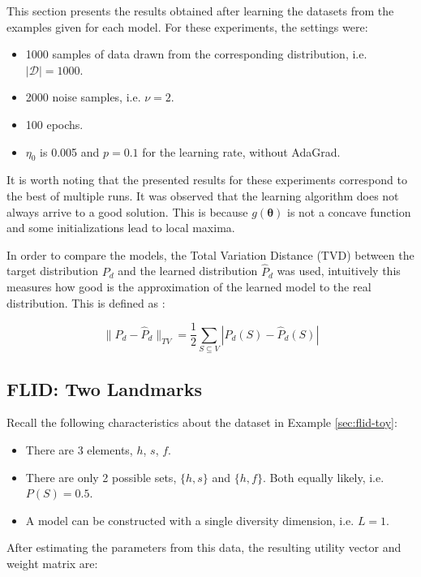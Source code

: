 This section presents the results obtained after learning the datasets from the examples given for each model. For these experiments, the settings were:

\begin{itemize}
  \item 1000 samples of data drawn from the corresponding distribution, i.e. $|\mathcal{D}| = 1000$.
  \item 2000 noise samples, i.e. $\nu = 2$.
  \item 100 epochs.
  \item $\eta_{0}$ is 0.005 and $p = 0.1$ for the learning rate, without AdaGrad.
\end{itemize}

It is worth noting that the presented results for these experiments correspond to the best of multiple runs. It was observed that the learning algorithm does not always arrive to a good solution. This is because $g(\boldsymbol{\theta})$ is not a concave function and some initializations lead to local maxima.

In order to compare the models, the Total Variation Distance (TVD) between the target distribution $P_{d}$ and the learned distribution $\hat{P}_{d}$ was used, intuitively this measures how good is the approximation of the learned model to the real distribution. This is defined as \citep[chap. 4]{levin2009markov}:

\begin{equation}
  \label{eq:total_var}
  \|P_{d} - \hat{P}_{d}\|_{TV}= \frac{1}{2}\sum_{S \subseteq V}|P_{d}(S) - \hat{P}_{d}(S)|
\end{equation}

\subsection{FLID: Two Landmarks}

Recall the following characteristics about the dataset in Example \ref{sec:flid-toy}:

\begin{itemize}
  \item There are 3 elements, $h$, $s$, $f$.
  \item There are only 2 possible sets, $\{h,s\}$ and $\{h,f\}$. Both equally likely, i.e. $P(S) = 0.5$.
  \item A model can be constructed with a single diversity dimension, i.e. $L=1$.
\end{itemize}

After estimating the parameters from this data, the resulting utility vector and weight matrix are:

